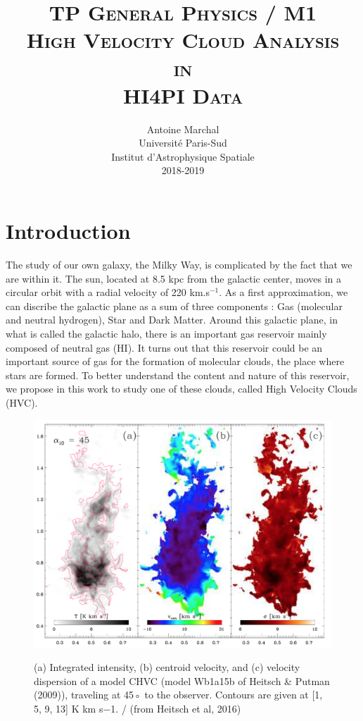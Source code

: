 \documentclass[a4paper,10.5pt]{report}
\title{{\textsc{\Large{TP General Physics / M1}\\ [3cm]
      \textbf{\LARGE{High Velocity Cloud Analysis \\ in \\ HI4PI Data}}}} \\[2cm]}
\author{Antoine Marchal \\ [1cm]
Université Paris-Sud \\ 
Institut d’Astrophysique Spatiale \\
2018-2019}
\date{}
\begin{document}
\begin{titlingpage}
\maketitle
\end{titlingpage}
\newpage

\newpage
\chapter{Introduction}
The study of our own galaxy, the Milky Way, is complicated by the fact that we are within it. 
The sun, located at 8.5 kpc from the galactic center, moves in a circular orbit with a radial velocity of 
220 km.s$^{-1}$. 
As a first approximation, we can discribe the galactic plane as a sum of three components : Gas (molecular and neutral hydrogen), Star 
and Dark Matter. Around this galactic plane, in what is called the galactic halo, there is an important gas reservoir mainly composed of neutral gas (HI). 
It turns out that this reservoir could be an important source of gas for the formation of molecular clouds, the place where stars are formed. 
To better understand the content and nature of this reservoir, we propose in this work to study one of these clouds, called High Velocity Clouds (HVC). 

\begin{figure}[h!]
  \centering
  \includegraphics[width=4.in]{simulation}
  \label{fig::simulation}
  \caption{(a) Integrated intensity, (b) centroid velocity, and (c) velocity dispersion of a model CHVC (model Wb1a15b of 
    Heitsch & Putman (2009)), traveling at 45◦ to the observer. Contours are given at [1, 5, 9, 13] K km s−1.  / 
    (from Heitsch et al, 2016)}
\end{figure} \\
 
\end{document}
